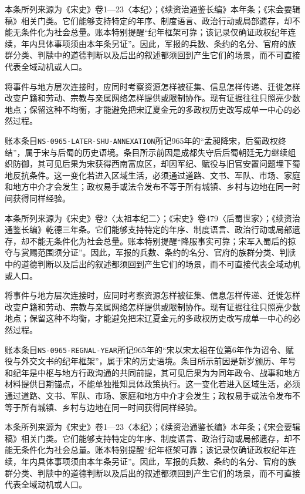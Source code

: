 本条所列来源为《宋史》卷1—23〈本纪〉；《续资治通鉴长编》本年条；《宋会要辑稿》相关门类。它们能够支持特定的年序、制度语言、政治行动或局部遗存，却不能无条件化为社会总量。账本特别提醒“纪年框架可靠；该记录仅确证政权纪年连续，年内具体事项须由本年条另证”。因此，军报的兵数、条约的名分、官府的族群分类、判牍中的道德判断以及后出的叙述都须回到产生它们的场景，而不可直接代表全域动机或人口。

将事件与地方层次连接时，应同时考察资源怎样被征集、信息怎样传递、迁徙怎样改变户籍和劳动、宗教与亲属网络怎样提供或限制协作。现有证据往往只照亮少数地点；保留这种不均衡，才能避免把宋辽夏金元的多政权历史改写成单一中心的必然过程。

账本条目\texttt{NS-0965-LATER-SHU-ANNEXATION}所记965年的“孟昶降宋，后蜀政权终结”，属于宋与后蜀的历史语境。条目所示前因是成都失守后后蜀朝廷无力继续组织防御，其可见后果为宋获得西南富庶区，却因军纪、赋役与旧官安置问题埋下蜀地反抗条件。这一变化若进入区域生活，必须通过道路、文书、军队、市场、家庭和地方中介才会发生；政权易手或法令发布不等于所有城镇、乡村与边地在同一时间获得同样经验。

本条所列来源为《宋史》卷2〈太祖本纪二〉；《宋史》卷479〈后蜀世家〉；《续资治通鉴长编》乾德三年条。它们能够支持特定的年序、制度语言、政治行动或局部遗存，却不能无条件化为社会总量。账本特别提醒“降服事实可靠；宋军入蜀后的掠夺与赏赐范围须分证”。因此，军报的兵数、条约的名分、官府的族群分类、判牍中的道德判断以及后出的叙述都须回到产生它们的场景，而不可直接代表全域动机或人口。

将事件与地方层次连接时，应同时考察资源怎样被征集、信息怎样传递、迁徙怎样改变户籍和劳动、宗教与亲属网络怎样提供或限制协作。现有证据往往只照亮少数地点；保留这种不均衡，才能避免把宋辽夏金元的多政权历史改写成单一中心的必然过程。

账本条目\texttt{NS-0965-REGNAL-YEAR}所记965年的“宋以宋太祖在位第6年作为诏令、赋役与外交文书的纪年框架”，属于宋的历史语境。条目所示前因是新岁颁历、年号和纪年是中枢与地方行政沟通的共同前提，其可见后果为为同年政令、战事和地方材料提供日期锚点，不能单独推知具体政策执行。这一变化若进入区域生活，必须通过道路、文书、军队、市场、家庭和地方中介才会发生；政权易手或法令发布不等于所有城镇、乡村与边地在同一时间获得同样经验。

本条所列来源为《宋史》卷1—23〈本纪〉；《续资治通鉴长编》本年条；《宋会要辑稿》相关门类。它们能够支持特定的年序、制度语言、政治行动或局部遗存，却不能无条件化为社会总量。账本特别提醒“纪年框架可靠；该记录仅确证政权纪年连续，年内具体事项须由本年条另证”。因此，军报的兵数、条约的名分、官府的族群分类、判牍中的道德判断以及后出的叙述都须回到产生它们的场景，而不可直接代表全域动机或人口。

